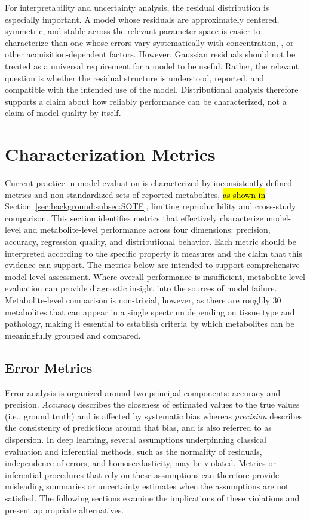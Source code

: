 For interpretability and uncertainty analysis, the residual distribution is especially important. A model whose residuals are approximately centered, symmetric, and stable across the relevant parameter space is easier to characterize than one whose errors vary systematically with concentration, \SNR, or other acquisition-dependent factors. However, Gaussian residuals should not be treated as a universal requirement for a model to be useful. Rather, the relevant question is whether the residual structure is understood, reported, and compatible with the intended use of the model. Distributional analysis therefore supports a claim about how reliably performance can be characterized, not a claim of model quality by itself.

\section{Characterization Metrics}\label{sec:eval metrics}
Current practice in \MRS model evaluation is characterized by inconsistently defined metrics and non-standardized sets of reported metabolites, \hl{as shown in }Section~\ref{sec:background:subsec:SOTF}, limiting reproducibility and cross-study comparison. This section identifies metrics that effectively characterize model-level and metabolite-level performance across four dimensions: precision, accuracy, regression quality, and distributional behavior. Each metric should be interpreted according to the specific property it measures and the claim that this evidence can support. The metrics below are intended to support comprehensive model-level assessment. Where overall performance is insufficient, metabolite-level evaluation can provide diagnostic insight into the sources of model failure. Metabolite-level comparison is non-trivial, however, as there are roughly 30 metabolites that can appear in a single \MRS spectrum depending on tissue type and pathology, making it essential to establish criteria by which metabolites can be meaningfully grouped and compared.

\subsection{Error Metrics}
\label{sec:Eval:subsec:errorMetrics}
Error analysis is organized around two principal components: accuracy and precision. \textit{Accuracy} describes the closeness of estimated values to the true values (i.e., ground truth) and is affected by systematic bias whereas \textit{precision} describes the consistency of predictions around that bias, and is also referred to as dispersion. In deep learning, several assumptions underpinning classical evaluation and inferential methods, such as the normality of residuals, independence of errors, and homoscedasticity, may be violated. Metrics or inferential procedures that rely on these assumptions can therefore provide misleading summaries or uncertainty estimates when the assumptions are not satisfied. The following sections examine the implications of these violations and present appropriate alternatives.

